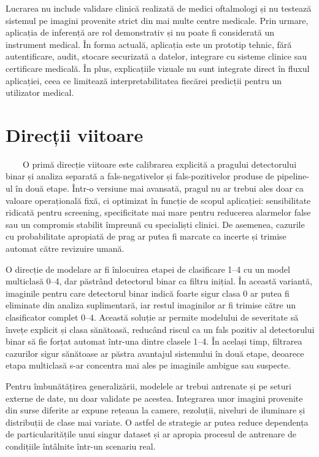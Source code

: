 \documentclass[12pt, a4paper, twoside, romanian]{teza-upb}
\begin{document}
Lucrarea nu include validare clinică realizată de medici oftalmologi și nu testează sistemul pe imagini
provenite strict din mai multe centre medicale. Prin urmare, aplicația de inferență are rol
demonstrativ și nu poate fi considerată un instrument medical. În forma actuală, aplicația este un
prototip tehnic, fără autentificare, audit, stocare securizată a datelor, integrare cu sisteme clinice
sau certificare medicală. În plus, explicațiile vizuale nu sunt integrate direct în fluxul aplicației,
ceea ce limitează interpretabilitatea fiecărei predicții pentru un utilizator medical.

\section{Direcții viitoare}

\ \ \ \ O primă direcție viitoare este calibrarea explicită a pragului detectorului binar și analiza
separată a fals-negativelor și fals-pozitivelor produse de pipeline-ul în două etape. Într-o versiune
mai avansată, pragul nu ar trebui ales doar ca valoare operațională fixă, ci optimizat în funcție de
scopul aplicației: sensibilitate ridicată pentru screening, specificitate mai mare pentru reducerea
alarmelor false sau un compromis stabilit împreună cu specialiști clinici. De asemenea, cazurile cu
probabilitate apropiată de prag ar putea fi marcate ca incerte și trimise automat către revizuire
umană.
\bigskip
 
O direcție de modelare ar fi înlocuirea etapei de clasificare 1--4 cu un model multiclasă 0--4,
dar păstrând detectorul binar ca filtru inițial. În această variantă, imaginile pentru care detectorul
binar indică foarte sigur clasa 0 ar putea fi eliminate din analiza suplimentară, iar restul imaginilor
ar fi trimise către un clasificator complet 0--4. Această soluție ar permite modelului de severitate să
învețe explicit și clasa sănătoasă, reducând riscul ca un fals pozitiv al detectorului binar să fie
forțat automat într-una dintre clasele 1--4. În același timp, filtrarea cazurilor sigur sănătoase ar
păstra avantajul sistemului în două etape, deoarece etapa multiclasă s-ar concentra mai ales pe
imaginile ambigue sau suspecte.
\bigskip

Pentru îmbunătățirea generalizării, modelele ar trebui antrenate și pe seturi externe de date, nu doar
validate pe acestea. Integrarea unor imagini provenite din surse diferite ar expune rețeaua la camere,
rezoluții, niveluri de iluminare și distribuții de clase mai variate. O astfel de strategie ar putea
reduce dependența de particularitățile unui singur dataset și ar apropia procesul de antrenare de
condițiile întâlnite într-un scenariu real.
\bigskip
\end{document}
